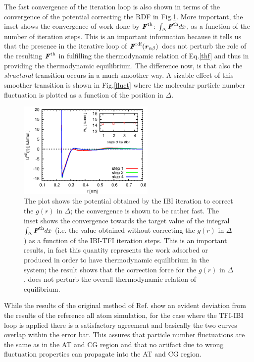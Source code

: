 \documentclass[aps,prb,preprint,citeautoscript]{revtex4}
\renewcommand{\v}[1]{\textbf{\textit{#1}}}
\begin{document}
The fast convergence of the iteration loop is also shown in terms of the convergence of the potential correcting the RDF in Fig.\ref{gpot}. More important, the inset shows the convergence of work done by ${\v F}^{\textrm{th}}$: $\int_{\Delta}{\v F}^{\textrm{th}}dx$, as a function of the number of iteration steps. This is an important information because it tells us that the presence in the iterative loop of $\v F^{\textrm{rdf}}(\v r_{\alpha\beta})$ does not perturb the role of the resulting ${\v F}^{\textrm{th}}$ in fulfilling the thermodynamic relation of Eq.\ref{thf} and thus in providing the thermodynamic equilibrium. The difference now, is that also the {\it structural} transition occurs in a much smoother way. A sizable effect of this smoother transition is shown in Fig.\ref{fluct} where the molecular particle number fluctuation is plotted as a function of the position in $\Delta$.
\begin{figure}
  \centering
  \includegraphics[width=0.59\textwidth]{force-rdf.eps}
  \caption{The plot shows the potential obtained by the IBI iteration to correct the $g(r)$ in $\Delta$; the convergence is shown to be rather fast. The inset shows the convergence towards the target value of the integral $\int_{\Delta}{\v F}^{\textrm{th}}dx$ (i.e. the value obtained without correcting the $g(r)$ in $\Delta$) as a function of the IBI-TFI iteration steps. This is an important results, in fact this quantity represents the work adsorbed or produced in order to have thermodynamic equilibrium in the system; the result shows that the correction force for the $g(r)$ in $\Delta$, does not perturb the overall thermodynamic relation of equilibrium.}
  \label{gpot}
\end{figure}
While the results of the original method of Ref.\cite{prlgc} show an evident deviation from the results of the reference all atom simulation, for the case where the TFI-IBI loop is applied there is a satisfactory agreement and basically the two curves overlap within the error bar. This assures that particle number fluctuations are the same as in the AT and CG region and that no artifact due to wrong fluctuation properties can propagate into the AT and CG region.
\end{document}
